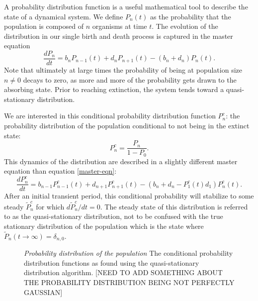 A probability distribution function is a useful mathematical tool to describe the state of a dynamical system.
We define $P_n(t)$ as the probability that the population is composed of $n$ organisms at time $t$.
The evolution of the distribution in our single birth and death process is captured in the master equation
\begin{equation}
\frac{dP_n}{dt} =  b_n P_{n-1}(t) + d_n P_{n+1}(t) - (b_n+d_n)P_n(t).
\label{master-eqn}
\end{equation}
Note that ultimately at large times the probability of being at population size $n\neq 0$ decays to zero, as more and more of the probability gets drawn to the absorbing state.
Prior to reaching extinction, the system tends toward a quasi-stationary distribution.

We are interested in this conditional probability distribution function $P_n^c$: the probability distribution of the population conditional to not being in the extinct state: %
\begin{equation}
P_n^c = \frac{P_n}{1-P_0}.
\end{equation}
This dynamics of the distribution are described in a slightly different master equation than equation \ref{master-eqn}:
\begin{equation}
\frac{dP_n^c}{dt} =  b_{n-1}P_{n-1}^c(t) + d_{n+1}P_{n+1}^c(t) - (b_n + d_n - P_1^c(t)d_1)P_n^c(t).
\label{masters2}
\end{equation}
After an initial transient period, this conditional probability will stabilize to some steady $\tilde{P}^c_n$ for which $d\tilde{P}_n^c/dt=0$.
The steady state of this distribution is referred to as the quasi-stationary distribution, not to be confused with the true stationary distribution of the population which is the state where $\tilde{P}_n(t \rightarrow \infty)=\delta_{n,0}$.

\begin{figure}[ht!]
  \centering
  \hfill
  \caption{\emph{Probability distribution of the population} The conditional probability distribution functions as found using the quasi-stationary distribution algorithm. [NEED TO ADD SOMETHING ABOUT THE PROBABILITY DISTRIBUTION BEING NOT PERFECTLY GAUSSIAN]}
  \label{qsd}
\end{figure}

